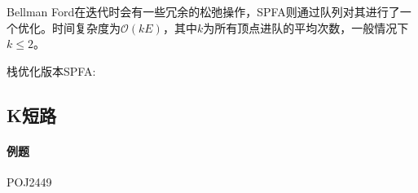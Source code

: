 Bellman Ford在迭代时会有一些冗余的松弛操作，SPFA则通过队列对其进行了一个优化。时间复杂度为$\mathcal{O}(kE)$，其中$k$为所有顶点进队的平均次数，一般情况下$k \leq 2$。



栈优化版本SPFA:



\subsection{K短路}

\paragraph{例题} POJ2449


